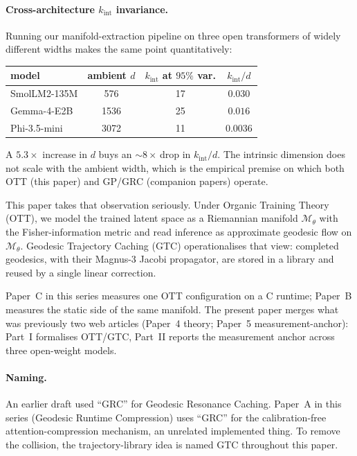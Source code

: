 \documentclass[11pt]{article}
\begin{document}
\paragraph{Cross-architecture $k_{\mathrm{int}}$ invariance.}
Running our manifold-extraction pipeline on three open transformers of
widely different widths makes the same point quantitatively:
\begin{center}\small
\begin{tabular}{lccc}\toprule
model & ambient $d$ & $k_{\mathrm{int}}$ at $95\%$ var. & $k_{\mathrm{int}}/d$\\\midrule
SmolLM2-135M   & 576  & 17 & $0.030$\\
Gemma-4-E2B    & 1536 & 25 & $0.016$\\
Phi-3.5-mini   & 3072 & 11 & $0.0036$\\\bottomrule
\end{tabular}\end{center}
A $5.3\times$ increase in $d$ buys an $\sim$8\,$\times$ drop in
$k_{\mathrm{int}}/d$.  The intrinsic dimension does not scale with the
ambient width, which is the empirical premise on which both OTT (this
paper) and GP/GRC (companion papers) operate.

This paper takes that observation seriously. Under Organic Training
Theory (OTT), we model the trained latent space as a Riemannian manifold
$\mathcal{M}_\theta$ with the Fisher-information metric and read inference as
approximate geodesic flow on $\mathcal{M}_\theta$. Geodesic Trajectory
Caching (GTC) operationalises that view: completed geodesics, with their
Magnus-3 Jacobi propagator, are stored in a library and reused by a single
linear correction.

Paper~C in this series \cite{papers3specdec} measures one OTT
configuration on a C runtime; Paper~B \cite{papers2geodesic_projection} measures the static side of the same
manifold. The present paper merges what was previously two web articles
(Paper~4 theory; Paper~5 measurement-anchor): Part~I formalises OTT/GTC,
Part~II reports the measurement anchor across three open-weight models.

\paragraph{Naming.} An earlier draft used ``GRC'' for Geodesic Resonance
Caching. Paper~A in this series (Geodesic Runtime Compression) uses ``GRC''
for the calibration-free attention-compression mechanism, an unrelated
implemented thing. To remove the collision, the trajectory-library idea is
named GTC throughout this paper.
\end{document}
